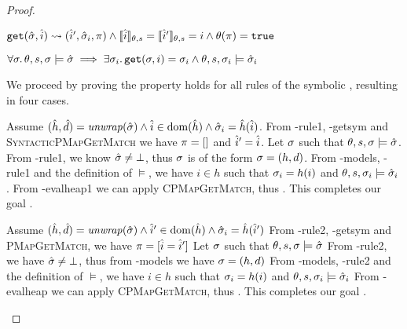 \begin{proof}


\pfassume \begin{hypvlist}
 $\texttt{get}(\hat{\sigma},\hat{i})\rightsquigarrow(\hat{i}', \hat{\sigma}_i, \pi) \land \llbracket\hat{i}\rrbracket_{\theta,s}=\llbracket\hat{i}'\rrbracket_{\theta,s}=i \land \theta(\pi)=\texttt{true} $
\end{hypvlist}
\pfprove \begin{goalvlist}
 $\forall \sigma\ldotp \theta,s,\sigma \models \hat{\sigma} \implies \exists \sigma_i \ldotp \texttt{get}(\sigma, i)=\sigma_i \land \theta,s,\sigma_i \models \hat{\sigma}_i$
\end{goalvlist}

We proceed by proving the property holds for all rules of the symbolic , resulting in four cases.


\begin{hypvlist}
 Assume $(\hat{h}, \hat{d})=\operatorname{\mathit{unwrap}}(\hat{\sigma}) \land \hat{i}\in\operatorname{dom}(\hat{h}) \land \hat{\sigma}_i=\hat{h}(\hat{i})$.
 From \hyp{rule1}, \hyp{getsym} and \textsc{SyntacticPMapGetMatch} we have $\pi=[]$ and $\hat{i}'=\hat{i}$.
 Let $\sigma$ such that $\theta,s,\sigma\models\hat{\sigma}$.
 From \hyp{rule1}, we know $\hat{\sigma}\neq\bot$, thus $\sigma$ is of the form $\sigma=(h,d)$.
 From \hyp{models}, \hyp{rule1} and the definition of $\models$, we have $i\in h$ such that $\sigma_i=h(i)$ and ${\theta,s,\sigma_i\models\hat{\sigma}_i}$.
 From \hyp{evalheap1} we can apply \textsc{CPMapGetMatch}, thus . This completes our goal .
\end{hypvlist}


\begin{hypvlist}
 Assume $(\hat{h},\hat{d})=\operatorname{\mathit{unwrap}}(\hat{\sigma}) \land \hat{i}'\in\operatorname{dom}(\hat{h}) \land \hat{\sigma}_i=\hat{h}(\hat{i}')$
 From \hyp{rule2}, \hyp{getsym} and \textsc{PMapGetMatch}, we have $\pi=[\hat{i}=\hat{i}']$
 Let $\sigma$ such that $\theta,s,\sigma\models\hat{\sigma}$
 From \hyp{rule2}, we have $\hat{\sigma}\neq\bot$, thus from \hyp{models} we have $\sigma=(h, d)$
 From \hyp{models}, \hyp{rule2} and the definition of $\models$, we have $i\in h$ such that $\sigma_i=h(i)$ and ${\theta,s,\sigma_i\models\hat{\sigma}_i}$
 From \hyp{evalheap} we can apply \textsc{CPMapGetMatch}, thus . This completes our goal .
\end{hypvlist}


\end{proof}
